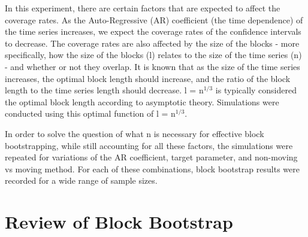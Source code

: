 \documentclass[12pt, letterpaper, titlepage]{article}
\begin{document}
In this experiment, there are certain factors that are expected to affect the coverage
rates. As the Auto-Regressive (AR) coefficient (the time dependence) of the time series 
increases,
we expect the coverage rates of the confidence intervals to decrease.
The coverage rates are also affected by the size of the blocks - more specifically,
how the size of the blocks (l) relates to the size of the time series (n) - 
and whether or not they overlap. It is known that as the size of the time series 
increases, the optimal block length should increase, and the ratio of the block length to 
the time series length should decrease. l = n$^{1/3}$ is typically considered the optimal 
block length according to asymptotic theory. \citep{buhlmann1999block} Simulations were conducted using this optimal function of l = n$^{1/3}$. 

In order to solve the question of what n is necessary for effective block bootstrapping,
while still accounting for all these factors, the simulations were repeated for
variations of the AR coefficient, target parameter, and non-moving vs moving method. For each of these combinations, block bootstrap results were recorded for a wide range of sample sizes.

\section{Review of Block Bootstrap}
\label{sec:blkbootreview}
\end{document}
